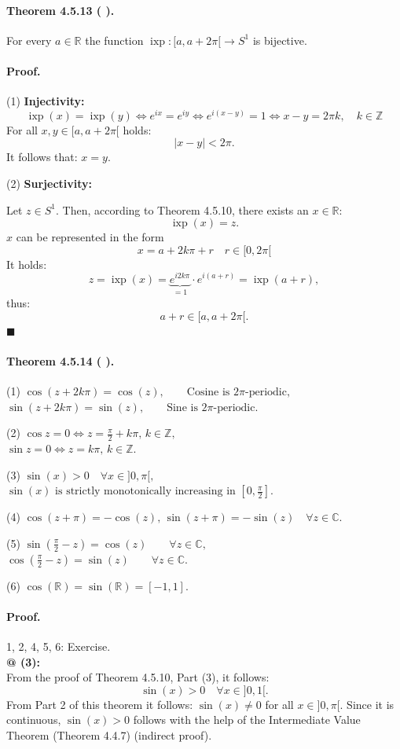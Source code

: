 \documentclass[12pt]{article}
\newcommand{\Z}{\mathbb{Z}}
\newcommand{\R}{\mathbb{R}}
\newcommand{\C}{\mathbb{C}}
\newcommand{\NumberedTheorem}[3]{%
\paragraph*{Theorem #1 ( #2 ).} #3\par}
\begin{document}
\NumberedTheorem{4.5.13}{}{For every $a \in \R$ the function $\operatorname{ixp} : [a, a + 2\pi[ \to S^1$ is bijective.}

\paragraph*{Proof.}

(1) \textbf{Injectivity:}
\[
\operatorname{ixp}(x) = \operatorname{ixp}(y) \iff e^{ix} = e^{iy} \iff e^{i(x-y)} = 1 \iff x - y = 2\pi k, \quad k \in \Z
\]
For all $x, y \in [a, a + 2\pi[$ holds:
\[
|x - y| < 2\pi.
\]
It follows that: $x = y$.

(2) \textbf{Surjectivity:}
\par\medskip
Let $z \in S^1$. Then, according to Theorem 4.5.10, there exists an $x \in \R$:
\[
\operatorname{ixp}(x) = z.
\]
$x$ can be represented in the form
\[
x = a + 2k\pi + r \quad r \in [0, 2\pi[
\]
It holds:
\[
z = \operatorname{ixp}(x) = \underbrace{e^{i2k\pi}}_{=1} \cdot e^{i(a+r)} = \operatorname{ixp}(a+r),
\]
thus:
\[
a + r \in [a, a + 2\pi[.
\]
\hfill $\blacksquare$

\NumberedTheorem{4.5.14}{}{
(1) $\cos(z + 2k\pi) = \cos(z), \qquad \text{Cosine is } 2\pi\text{-periodic,}$ \\
\phantom{(1)} $\sin(z + 2k\pi) = \sin(z), \qquad \text{Sine is } 2\pi\text{-periodic.}$
\par\medskip
(2) $\cos z = 0 \iff z = \frac{\pi}{2} + k\pi, \, k \in \Z,$ \\
\phantom{(2)} $\sin z = 0 \iff z = k\pi, \, k \in \Z.$
\par\medskip
(3) $\sin(x) > 0 \quad \forall x \in ]0, \pi[,$ \\
\phantom{(3)} $\sin(x) \text{ is strictly monotonically increasing in } [0, \frac{\pi}{2}].$
\par\medskip
(4) $\cos(z + \pi) = -\cos(z), \, \sin(z + \pi) = -\sin(z) \quad \forall z \in \C.$
\par\medskip
(5) $\sin(\frac{\pi}{2} - z) = \cos(z) \qquad \forall z \in \C,$ \\
\phantom{(5)} $\cos(\frac{\pi}{2} - z) = \sin(z) \qquad \forall z \in \C.$
\par\medskip
(6) $\cos(\R) = \sin(\R) = [-1, 1].$
}

\paragraph*{Proof.} 1, 2, 4, 5, 6: Exercise. \\
\textbf{@ (3):} \\
From the proof of Theorem 4.5.10, Part (3), it follows:
\[
\sin(x) > 0 \quad \forall x \in ]0, 1[.
\]
From Part 2 of this theorem it follows: $\sin(x) \neq 0$ for all $x \in ]0, \pi[$. Since it is continuous, $\sin(x) > 0$ follows with the help of the Intermediate Value Theorem (Theorem 4.4.7) (indirect proof).
\end{document}
